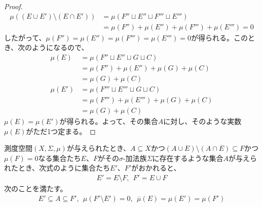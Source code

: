 \documentclass[dvipdfmx]{jsarticle}
\begin{document}
\begin{proof}
\begin{align*}
\mu\left( \left( E \cup E' \right) \setminus \left( E \cap E' \right) \right) &= \mu\left( F'' \sqcup E'' \sqcup F''' \sqcup E''' \right)\\
&= \mu\left( F'' \right) + \mu\left( E'' \right) + \mu\left( F''' \right) + \mu\left( E''' \right) = 0
\end{align*}
したがって、$\mu\left( F'' \right) = \mu\left( E'' \right) = \mu\left( F''' \right) = \mu\left( E''' \right) = 0$が得られる。このとき、次のようになるので、
\begin{align*}
\mu(E) &= \mu\left( F'' \sqcup E'' \sqcup G \sqcup C \right)\\
&= \mu\left( F'' \right) + \mu\left( E'' \right) + \mu(G) + \mu(C)\\
&= \mu(G) + \mu(C)\\
\mu\left( E' \right) &= \mu\left( F''' \sqcup E''' \sqcup G \sqcup C \right)\\
&= \mu\left( F''' \right) + \mu\left( E''' \right) + \mu(G) + \mu(C)\\
&= \mu(G) + \mu(C)
\end{align*}
$\mu(E) = \mu\left( E' \right)$が得られる。よって、その集合$A$に対し、そのような実数$\mu(E)$がただ1つ定まる。
\end{proof}
\begin{thm}\label{4.5.3.20}
測度空間$(X,\varSigma,\mu)$が与えられたとき、$A \subseteq X$かつ$(A \cup E) \setminus (A \cap E) \subseteq F$かつ$\mu(F) = 0$なる集合たち$E$、$F$がその$\sigma$-加法族$\varSigma$に存在するような集合$A$が与えられたとき、次式のように集合たち$E'$、$F'$がおかれると、
\begin{align*}
E' = E \setminus F,\ \ F' = E \cup F
\end{align*}
次のことを満たす。
\begin{align*}
E' \subseteq A \subseteq F',\ \ \mu\left( F' \setminus E' \right) = 0,\ \ \overline{\mu}(E) = \mu\left( E' \right) = \mu\left( F' \right)
\end{align*}
\end{thm}
\end{document}
